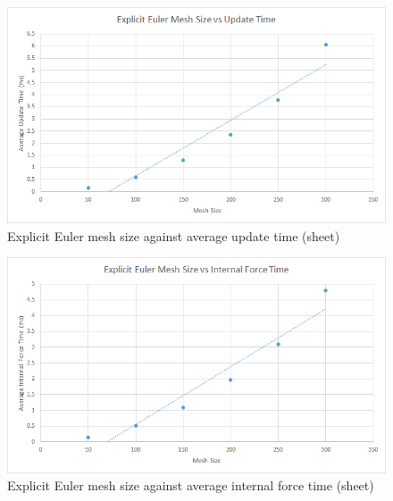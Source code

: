     \begin{figure}
    \begin{center}
      \includegraphics[scale=.9]{Figures/sheet_ee_m_ut}
    \end{center}
    \caption{Explicit Euler mesh size against average update time (sheet)}
    \label{fig:ee mesh update sheet}
  \end{figure}
  
    \begin{figure}
    \begin{center}
      \includegraphics[scale=.9]{Figures/sheet_ee_m_csf}
    \end{center}
    \caption{Explicit Euler mesh size against average internal force time (sheet)}
    \label{fig:ee mesh csf sheet}
  \end{figure}
  
